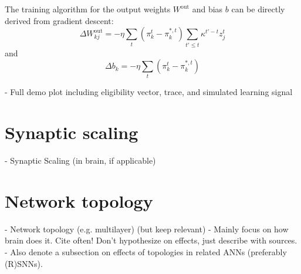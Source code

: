         The training algorithm for the output weights $W^\text{out}$ and bias $b$ can be directly derived from gradient descent:
        \begin{equation}
        \Delta W^\text{out}_{kj} = -\eta \sum_t\left(\pi^t_k - \pi^{*,t}_k\right)\sum_{t'\leq t}\kappa^{t'-t}z^t_j
        \end{equation}
        and
        \begin{equation}
        \Delta b_k = -\eta \sum_t\left(\pi^t_k - \pi^{*,t}_k\right)
        \end{equation}

    \begin{tcolorbox}[colback=orange]
    - Full demo plot including eligibility vector, trace, and simulated learning signal

    \end{tcolorbox}

\section{Synaptic scaling}

    \begin{tcolorbox}[colback=orange]
    - Synaptic Scaling (in brain, if applicable)

    \end{tcolorbox}


\section{Network topology}

    \begin{tcolorbox}[colback=orange]
      - Network topology (e.g. multilayer) (but keep relevant)
      - Mainly focus on how brain does it. Cite often! Don't hypothesize on effects, just describe with sources.
      - Also denote a subsection on effects of topologies in related ANNs (preferably (R)SNNs).

    \end{tcolorbox}
